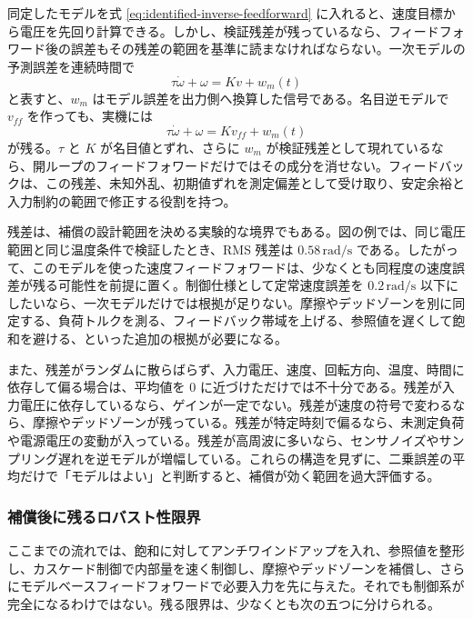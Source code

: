 同定したモデルを式 \eqref{eq:identified-inverse-feedforward} に入れると、速度目標から電圧を先回り計算できる。しかし、検証残差が残っているなら、フィードフォワード後の誤差もその残差の範囲を基準に読まなければならない。一次モデルの予測誤差を連続時間で
\begin{equation}
  \tau\dot{\omega}+\omega=Kv+w_m(t)
  \label{eq:model-error-as-disturbance}
\end{equation}
と表すと、$w_m$ はモデル誤差を出力側へ換算した信号である。名目逆モデルで $v_{ff}$ を作っても、実機には
\begin{equation}
  \tau\dot{\omega}+\omega
  =
  K v_{ff}+w_m(t)
\end{equation}
が残る。$\tau$ と $K$ が名目値とずれ、さらに $w_m$ が検証残差として現れているなら、開ループのフィードフォワードだけではその成分を消せない。フィードバックは、この残差、未知外乱、初期値ずれを測定偏差として受け取り、安定余裕と入力制約の範囲で修正する役割を持つ。

残差は、補償の設計範囲を決める実験的な境界でもある。図の例では、同じ電圧範囲と同じ温度条件で検証したとき、RMS 残差は $0.58\,\mathrm{rad/s}$ である。したがって、このモデルを使った速度フィードフォワードは、少なくとも同程度の速度誤差が残る可能性を前提に置く。制御仕様として定常速度誤差を $0.2\,\mathrm{rad/s}$ 以下にしたいなら、一次モデルだけでは根拠が足りない。摩擦やデッドゾーンを別に同定する、負荷トルクを測る、フィードバック帯域を上げる、参照値を遅くして飽和を避ける、といった追加の根拠が必要になる。

また、残差がランダムに散らばらず、入力電圧、速度、回転方向、温度、時間に依存して偏る場合は、平均値を 0 に近づけただけでは不十分である。残差が入力電圧に依存しているなら、ゲインが一定でない。残差が速度の符号で変わるなら、摩擦やデッドゾーンが残っている。残差が特定時刻で偏るなら、未測定負荷や電源電圧の変動が入っている。残差が高周波に多いなら、センサノイズやサンプリング遅れを逆モデルが増幅している。これらの構造を見ずに、二乗誤差の平均だけで「モデルはよい」と判断すると、補償が効く範囲を過大評価する。

\subsubsection{補償後に残るロバスト性限界}

ここまでの流れでは、飽和に対してアンチワインドアップを入れ、参照値を整形し、カスケード制御で内部量を速く制御し、摩擦やデッドゾーンを補償し、さらにモデルベースフィードフォワードで必要入力を先に与えた。それでも制御系が完全になるわけではない。残る限界は、少なくとも次の五つに分けられる。

